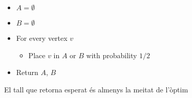 \begin{itemize}
\item $A = \emptyset$
\item $B = \emptyset$
\item For every vertex $v$
  \begin{itemize}
\item Place $v$ in $A$ or $B$ with probability $1/2$
  \end{itemize}
  \item Return $A$, $B$
\end{itemize}
El tall que retorna esperat és almenys la meitat de l'òptim